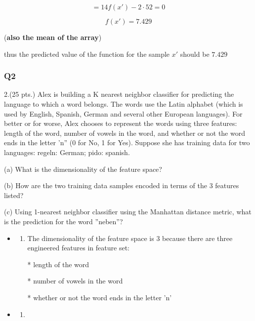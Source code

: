 \documentclass[11pt]{article}
\providecommand{\tightlist}{%
      \setlength{\itemsep}{0pt}\setlength{\parskip}{0pt}}
\begin{document}
\begin{itemize}
 \begin{equation*}
 	=14 f(x') -2 \cdot 52 = 0
 \end{equation*}

  \[f(x') = 7.429\]

  (\textbf{also the mean of the array})

  thus the predicted value of the function for the sample \(x'\) should
  be \(7.429\)
\end{itemize}

    \subsubsection*{Q2}\label{q2}

    2.(25 pts.) Alex is building a K nearest neighbor classifier for
predicting the language to which a word belongs. The words use the Latin
alphabet (which is used by English, Spanish, German and several other
European languages). For better or for worse, Alex chooses to represent
the words using three features: length of the word, number of vowels in
the word, and whether or not the word ends in the letter 'n'' (0 for No,
1 for Yes). Suppose she has training data for two languages: regeln:
German; pido: spanish.

(a) What is the dimensionality of the feature space?
 
(b) How are the two training data samples encoded in terms of the 3
    features listed?

(c) Using 1-nearest neighbor classifier using the Manhattan distance
    metric, what is the prediction for the word ''neben''?


    \begin{itemize}
\item
  \begin{enumerate}
  \def\labelenumi{(\alph{enumi})}
  \tightlist
  \item
    The dimensionality of the feature space is 3 because there are three
    engineered features in feature set:
  \end{enumerate}

  \begin{itemize}
  \tightlist
  \item[*]
    length of the word
  \item[*]
    number of vowels in the word
  \item[*]
    whether or not the word ends in the letter 'n'
  \end{itemize}
\item
  \begin{enumerate}
  \def\labelenumi{(\alph{enumi})}
  \setcounter{enumi}{1}
  \item
  \end{enumerate}
\end{itemize}
\end{document}
